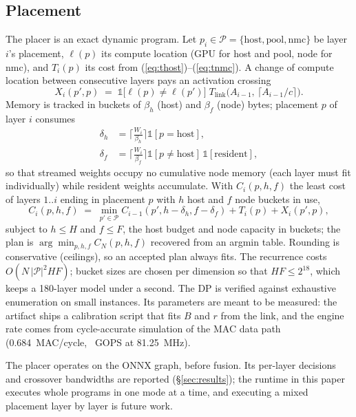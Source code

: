 \documentclass[lettersize,journal]{IEEEtran}
\begin{document}
\subsection{Placement}
\label{sec:placement}
The placer is an exact dynamic program. Let $p_i \in \mathcal{P} = \{\text{host}, \text{pool}, \text{nmc}\}$ be layer $i$'s placement, $\ell(p)$ its compute location (GPU for host and pool, node for nmc), and $T_i(p)$ its cost from (\ref{eq:thost})--(\ref{eq:tnmc}). A change of compute location between consecutive layers pays an activation crossing
\begin{equation}
X_i(p', p) \;=\; \mathbb{1}\big[\ell(p) \ne \ell(p')\big]\; T_{\text{link}}\!\big(A_{i-1},\, \lceil A_{i-1}/c \rceil\big).
\label{eq:crossing}
\end{equation}
Memory is tracked in buckets of $\beta_h$ (host) and $\beta_f$ (node) bytes; placement $p$ of layer $i$ consumes
\begin{align}
\delta_h &= \Big\lceil \tfrac{W_i}{\beta_h} \Big\rceil \mathbb{1}[p = \text{host}], \nonumber\\
\delta_f &= \Big\lceil \tfrac{W_i}{\beta_f} \Big\rceil \mathbb{1}[p \ne \text{host}]\,\mathbb{1}[\text{resident}],
\label{eq:usage}
\end{align}
so that streamed weights occupy no cumulative node memory (each layer must fit individually) while resident weights accumulate. With $C_i(p, h, f)$ the least cost of layers $1..i$ ending in placement $p$ with $h$ host and $f$ node buckets in use,
\begin{equation}
C_i(p, h, f) \;=\; \min_{p' \in \mathcal{P}} C_{i-1}(p', h - \delta_h, f - \delta_f) + T_i(p) + X_i(p', p),
\label{eq:dp}
\end{equation}
subject to $h \le H$ and $f \le F$, the host budget and node capacity in buckets; the plan is $\arg\min_{p,h,f} C_N(p,h,f)$ recovered from an argmin table. Rounding is conservative (ceilings), so an accepted plan always fits. The recurrence costs $O(N\,|\mathcal{P}|^2 H F)$; bucket sizes are chosen per dimension so that $HF \le 2^{18}$, which keeps a 180-layer model under a second. The DP is verified against exhaustive enumeration on small instances. Its parameters are meant to be measured: the artifact ships a calibration script that fits $B$ and $r$ from the link, and the engine rate comes from cycle-accurate simulation of the MAC data path (0.684~MAC/cycle, \CDlrmFpgaGops~GOPS at 81.25~MHz).

The placer operates on the ONNX graph, before fusion. Its per-layer decisions and crossover bandwidths are reported (\S\ref{sec:results}); the runtime in this paper executes whole programs in one mode at a time, and executing a mixed placement layer by layer is future work.
\end{document}
